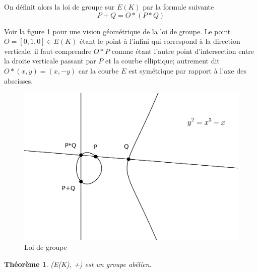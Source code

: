 \documentclass{article}
\newtheorem{theoreme}{Théorème}
\begin{document}
On définit alors la loi de groupe sur $E(K)$ par la formule suivante
\begin{equation*}
P+Q = O*(P*Q)
\end{equation*}

Voir la figure \ref{loigpe} pour une vision géométrique de la loi de groupe.
Le point $O=[0,1,0]\in E(K)$ étant le point à
l'infini qui correspond à la direction verticale, il faut comprendre $O*P$ comme étant l'autre point
d'intersection entre la droite verticale passant par $P$ et la courbe elliptique; autrement dit $O*(x,y)=(x,-y)$
car la courbe $E$ est symétrique par rapport à l'axe des abscisses.

\begin{figure}[t]
\begin{center}
\includegraphics{cub.png}
\end{center}
\caption{Loi de groupe}
\label{loigpe}
\end{figure}

\begin{theoreme}
(E(K), +) est un groupe abélien.
\end{theoreme}
\end{document}
